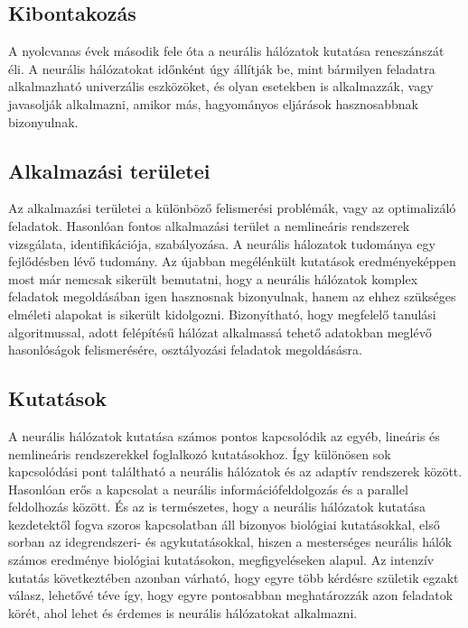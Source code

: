 \documentclass[letterpaper,10pt,magyar]{sphinxmanual}
\begin{document}
\subsection{Kibontakozás}
\label{\detokenize{pages/overview:kibontakozas}}
A nyolcvanas évek második fele óta a neurális hálózatok kutatása reneszánszát éli. A neurális hálózatokat időnként úgy állítják be, mint bármilyen feladatra alkalmazható univerzális eszközöket, és olyan esetekben is alkalmazzák, vagy javasolják alkalmazni, amikor más, hagyományos eljárások hasznosabbnak bizonyulnak.


\subsection{Alkalmazási területei}
\label{\detokenize{pages/overview:alkalmazasi-teruletei}}
Az alkalmazási területei a különböző felismerési problémák, vagy az optimalizáló feladatok. Hasonlóan fontos alkalmazási terület a nemlineáris rendszerek vizsgálata, identifikációja, szabályozása. A neurális hálozatok tudománya egy fejlődésben lévő tudomány. Az újabban megélénkült kutatások eredményeképpen most már nemcsak sikerült bemutatni, hogy a neurális hálózatok komplex feladatok megoldásában igen hasznosnak bizonyulnak, hanem az ehhez szükséges elméleti alapokat is sikerült kidolgozni. Bizonyítható, hogy megfelelő tanulási algoritmussal, adott felépítésű hálózat alkalmassá tehető adatokban meglévő hasonlóságok felismerésére, osztályozási feladatok megoldásásra.


\subsection{Kutatások}
\label{\detokenize{pages/overview:kutatasok}}
A neurális hálózatok kutatása számos pontos kapcsolódik az egyéb, lineáris és nemlineáris rendszerekkel foglalkozó kutatásokhoz. Így különösen sok kapcsolódási pont találtható a neurális hálózatok és az adaptív rendszerek között. Hasonlóan erős a kapcsolat a neurális információfeldolgozás és a parallel feldolhozás között. És az is természetes, hogy a neurális hálózatok kutatása kezdetektől fogva szoros kapcsolatban áll bizonyos biológiai kutatásokkal, első sorban az idegrendszeri- és agykutatásokkal, hiszen a mesterséges neurális hálók számos eredménye biológiai kutatásokon, megfigyeléseken alapul. Az intenzív kutatás következtében azonban várható, hogy egyre több kérdésre születik egzakt válasz, lehetővé téve így, hogy egyre pontosabban meghatározzák azon feladatok körét, ahol lehet és érdemes is neurális hálózatokat alkalmazni.
\end{document}
